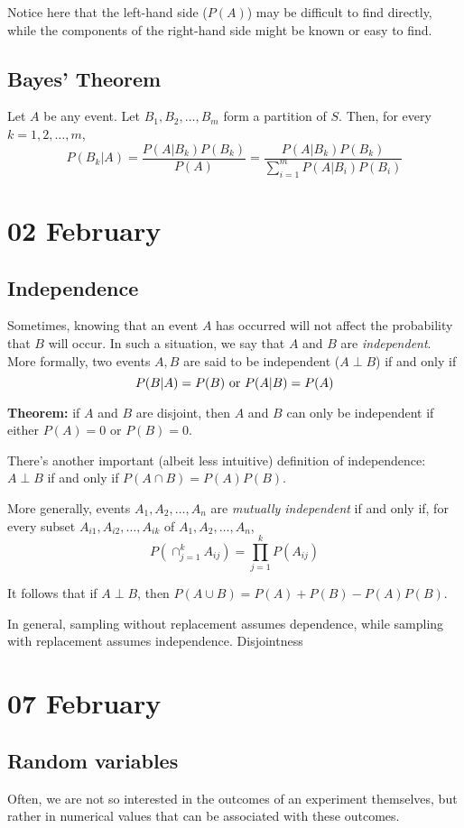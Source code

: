 \documentclass[12pt]{article}
\begin{document}
Notice here that the left-hand side ($P(A)$) may be difficult to find directly, while the components of the right-hand side might be known or easy to find.

\subsection{Bayes' Theorem}
Let $A$ be any event. Let $B_1, B_2, \dots, B_m$ form a partition of $S$. Then, for every $k = 1, 2, \dots, m$,
\[
	P(B_k | A) = \frac{P(A | B_k) P(B_k)}{P(A)} = \frac{P(A | B_k) P(B_k)}{\sum_{i=1}^m P(A | B_i) P(B_i)}
\]

\section{02 February}
\subsection{Independence}
Sometimes, knowing that an event $A$ has occurred will not affect the probability that $B$ will occur. In such a situation, we say that $A$ and $B$ are \emph{independent}. More formally, two events $A,B$ are said to be independent ($A \perp B$) if and only if
\[
	P(B | A) = P(B) \textnormal{ or } P(A | B) = P(A)
\]

\textbf{Theorem:} if $A$ and $B$ are disjoint, then $A$ and $B$ can only be independent if either $P(A) = 0$ or $P(B) = 0$.

There's another important (albeit less intuitive) definition of independence: $A \perp B$ if and only if $P(A \cap B) = P(A)P(B)$. 

More generally, events $A_1, A_2, \dots, A_n$ are \emph{mutually independent} if and only if, for every subset $A_{i1}, A_{i2}, \dots, A_{ik}$ of $A_1, A_2, \dots, A_n$,
\[
	P(\cap_{j=1}^k A_{ij}) = \prod_{j=1}^k P(A_{ij})
\]

It follows that if $A \perp B$, then $P(A \cup B) = P(A) + P(B) - P(A) P(B)$.

In general, sampling without replacement assumes dependence, while sampling with replacement assumes independence.  Disjointness 

\section{07 February} 
\subsection{Random variables}
Often, we are not so interested in the outcomes of an experiment themselves, but rather in numerical values that can be associated with these outcomes. 
\end{document}
